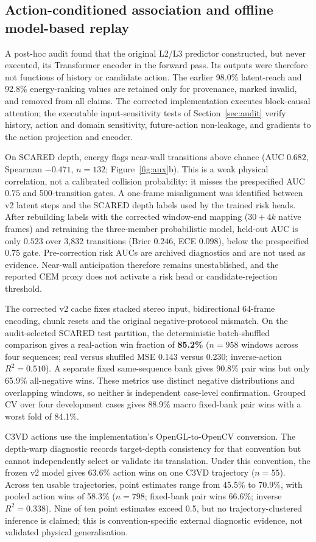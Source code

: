 \documentclass[preprint,12pt]{elsarticle}
\begin{document}
\subsection{Action-conditioned association and offline model-based replay}
\label{sec:rq3}
A post-hoc audit found that the original L2/L3 predictor constructed, but
never executed, its Transformer encoder in the forward pass. Its outputs were
therefore not functions of history or candidate action. The earlier 98.0\% latent-reach and 92.8\% energy-ranking
values are retained only for provenance, marked invalid, and removed from all
claims. The corrected implementation executes block-causal attention; the
executable input-sensitivity tests of Section~\ref{sec:audit} verify history,
action and domain sensitivity, future-action
non-leakage, and gradients to the action projection and encoder.

On SCARED depth, energy flags near-wall transitions above chance (AUC $0.682$, Spearman $-0.471$, $n{=}132$; Figure~\ref{fig:aux}b).
This is a weak physical correlation, not a calibrated collision probability:
it misses the prespecified AUC $0.75$ and 500-transition gates.
A one-frame misalignment was identified between v2 latent steps and the
SCARED depth labels used by the trained risk heads. After rebuilding labels
with the corrected window-end mapping ($30+4k$ native frames) and retraining
the three-member probabilistic model, held-out AUC is only $0.523$ over 3,832
transitions (Brier $0.246$, ECE $0.098$), below the prespecified $0.75$ gate.
Pre-correction risk AUCs are archived diagnostics and are not used as
evidence. Near-wall anticipation therefore remains unestablished, and the
reported CEM proxy does not activate a risk head or candidate-rejection
threshold.

The corrected v2 cache fixes stacked stereo input, bidirectional 64-frame
encoding, chunk resets and the original negative-protocol mismatch.
On the audit-selected SCARED test partition, the deterministic batch-shuffled
comparison gives a real-action win fraction of \textbf{85.2\%}
($n{=}958$ windows across four sequences; real versus shuffled MSE 0.143 versus
0.230; inverse-action $R^2{=}0.510$). A separate fixed same-sequence bank gives
90.8\% pair wins but only 65.9\% all-negative wins. These metrics use distinct
negative distributions and overlapping windows, so neither is independent
case-level confirmation. Grouped CV over four development cases gives 88.9\%
macro fixed-bank pair wins with a worst fold of 84.1\%.

C3VD actions use the implementation's OpenGL-to-OpenCV conversion. The
depth-warp diagnostic records target-depth consistency for that convention but
cannot independently select or validate its translation. Under this
convention, the frozen v2 model gives 63.6\% action wins on one C3VD
trajectory ($n{=}55$). Across ten usable trajectories, point estimates range
from 45.5\% to 70.9\%, with pooled action wins of 58.3\%
($n{=}798$; fixed-bank pair wins 66.6\%; inverse $R^2{=}0.338$). Nine of ten
point estimates exceed 0.5, but no trajectory-clustered inference is claimed;
this is convention-specific external diagnostic evidence, not validated
physical generalisation.
\end{document}
